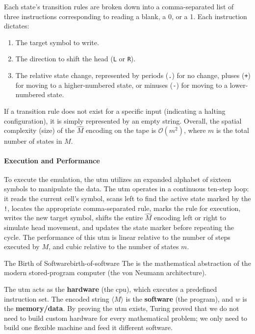 Each state's transition rules are broken down into a comma-separated list of three instructions corresponding to reading a blank, a 0, or a 1. Each instruction dictates:
\begin{enumerate}
    \item The target symbol to write.
    \item The direction to shift the head (\texttt{L} or \texttt{R}).
    \item The relative state change, represented by periods (\texttt{.}) for no change, pluses (\texttt{+}) for moving to a higher-numbered state, or minuses (\texttt{-}) for moving to a lower-numbered state.
\end{enumerate}
If a transition rule does not exist for a specific input (indicating a halting configuration), it is simply represented by an empty string. Overall, the spatial complexity (size) of the $\hat{M}$ encoding on the tape is $\mathcal{O}(m^2)$, where $m$ is the total number of states in $M$.

\paragraph{Execution and Performance}
To execute the emulation, the \gls{utm} utilizes an expanded alphabet of sixteen symbols to manipulate the data. The \gls{utm} operates in a continuous ten-step loop: it reads the current cell's symbol, scans left to find the active state marked by the \texttt{!}, locates the appropriate comma-separated rule, marks the rule for execution, writes the new target symbol, shifts the entire $\hat{M}$ encoding left or right to simulate head movement, and updates the state marker before repeating the cycle. The performance of this \gls{utm} is linear relative to the number of steps executed by $M$, and cubic relative to the number of states $m$.

\begin{concept}{The Birth of Software}{birth-of-software}
    The  is the mathematical abstraction of the modern stored-program computer (the von Neumann architecture). 
    
    The \gls{utm} acts as the \textbf{hardware} (the \gls{cpu}), which executes a predefined instruction set. The encoded string $\langle M \rangle$ is the \textbf{software} (the program), and $w$ is the \textbf{memory/data}. By proving the \gls{utm} exists, Turing proved that we do not need to build custom hardware for every mathematical problem; we only need to build one flexible machine and feed it different software.
\end{concept}